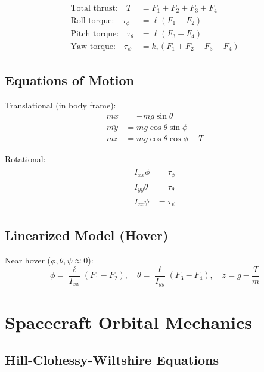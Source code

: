 \begin{align}
\text{Total thrust:} \quad T &= F_1 + F_2 + F_3 + F_4 \\
\text{Roll torque:} \quad \tau_\phi &= \ell(F_1 - F_2) \\
\text{Pitch torque:} \quad \tau_\theta &= \ell(F_3 - F_4) \\
\text{Yaw torque:} \quad \tau_\psi &= k_\tau(F_1 + F_2 - F_3 - F_4)
\end{align}

\subsection{Equations of Motion}

Translational (in body frame):
\begin{align}
m\ddot{x} &= -mg\sin\theta \\
m\ddot{y} &= mg\cos\theta\sin\phi \\
m\ddot{z} &= mg\cos\theta\cos\phi - T
\end{align}

Rotational:
\begin{align}
I_{xx}\ddot{\phi} &= \tau_\phi \\
I_{yy}\ddot{\theta} &= \tau_\theta \\
I_{zz}\ddot{\psi} &= \tau_\psi
\end{align}

\subsection{Linearized Model (Hover)}

Near hover ($\phi, \theta, \psi \approx 0$):
\begin{equation}
\ddot{\phi} = \frac{\ell}{I_{xx}}(F_1 - F_2), \quad
\ddot{\theta} = \frac{\ell}{I_{yy}}(F_3 - F_4), \quad
\ddot{z} = g - \frac{T}{m}
\end{equation}

\section{Spacecraft Orbital Mechanics}
\label{sec:orbital}

\subsection{Hill-Clohessy-Wiltshire Equations}

